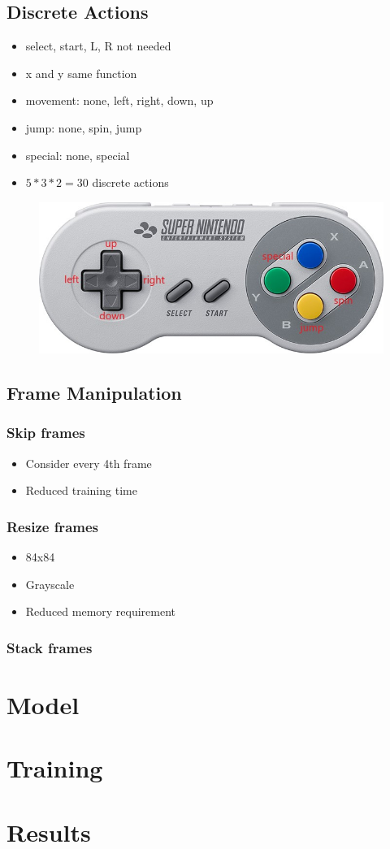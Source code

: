 \documentclass{article}
\begin{document}
    \subsection{Discrete Actions}
    \begin{itemize}
        \item select, start, L, R not needed
        \item x and y same function
        \item movement: none, left, right, down, up
        \item jump: none, spin, jump
        \item special: none, special
        \item $5*3*2=30$ discrete actions
    \end{itemize}
    \begin{figure}[H]
    \includegraphics[width=.85\textwidth]{snes-controller-annot}
    \centering
    \end{figure}
    \subsection{Frame Manipulation}
    \subsubsection*{Skip frames}
    \begin{itemize}
        \item Consider every 4th frame
        \item Reduced training time
    \end{itemize}
    \subsubsection*{Resize frames}
    \begin{itemize}
        \item 84x84
        \item Grayscale
        \item Reduced memory requirement
    \end{itemize}
    \subsubsection*{Stack frames}

    \section{Model}

    \section{Training}

    \section{Results}
\end{document}
